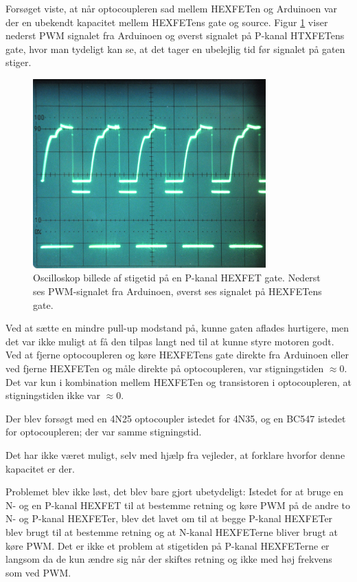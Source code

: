 \documentclass[a4paper,oneside,article,danish,table]{memoir}
\begin{document}

Forsøget viste, at når optocoupleren sad mellem HEXFETen og Arduinoen var der en ubekendt kapacitet mellem HEXFETens gate og source. Figur \ref{fig:stigetid} viser nederst PWM signalet fra Arduinoen og øverst signalet på P-kanal HTXFETens gate, hvor man tydeligt kan se, at det tager en ubelejlig tid før signalet på gaten stiger.
\begin{figure}[htbp]
  \centering
  \includegraphics[width=0.8\textwidth]{pictures/stigetid.jpg}
  \caption[Oscilloskop billede af stigetid på en P-kanal HEXFET gate]{Oscilloskop billede af stigetid på en P-kanal HEXFET gate. Nederst ses PWM-signalet fra Arduinoen, øverst ses signalet på HEXFETens gate.}
  \label{fig:stigetid}
\end{figure}

Ved at sætte en mindre pull-up modstand på, kunne gaten aflades hurtigere, men det var ikke muligt at få den tilpas langt ned til at kunne styre motoren godt. Ved at fjerne optocoupleren og køre HEXFETens gate direkte fra Arduinoen eller ved fjerne HEXFETen og måle direkte på optocoupleren, var stigningstiden $\approx0$. Det var kun i kombination mellem HEXFETen og transistoren i optocoupleren, at stigningstiden ikke var $\approx0$.

Der blev forsøgt med en 4N25 optocoupler istedet for 4N35, og en BC547 istedet for optocoupleren; der var samme stigningstid.

Det har ikke været muligt, selv med hjælp fra vejleder, at forklare hvorfor denne kapacitet er der.

Problemet blev ikke løst, det blev bare gjort ubetydeligt: Istedet for at bruge en N- og en P-kanal HEXFET til at bestemme retning og køre PWM på de andre to N- og P-kanal HEXFETer, blev det lavet om til at begge P-kanal HEXFETer blev brugt til at bestemme retning og at N-kanal HEXFETerne bliver brugt at køre PWM. Det er ikke et problem at stigetiden på P-kanal HEXFETerne er langsom da de kun ændre sig når der skiftes retning og ikke med høj frekvens som ved PWM.
\end{document}
